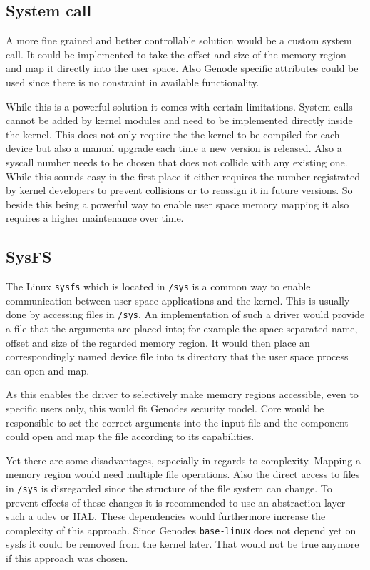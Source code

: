 \documentclass[
a4paper,
12pt,
notitlepage,
parskip=half,
DIV=11,
]{scrbook}
\begin{document}
		\subsection{System call}
		
		A more fine grained and better controllable solution would be a custom system call.
		It could be implemented to take the offset and size of the memory region and map it directly into the user space.
		Also Genode specific attributes could be used since there is no constraint in available functionality.
		
		While this is a powerful solution it comes with certain limitations.
		System calls cannot be added by kernel modules and need to be implemented directly inside the kernel.
		This does not only require the the kernel to be compiled for each device but also a manual upgrade each time a new version is released.
		Also a syscall number needs to be chosen that does not collide with any existing one.
		While this sounds easy in the first place it either requires the number registrated by kernel developers to prevent collisions or to reassign it in future versions.
		So beside this being a powerful way to enable user space memory mapping it also requires a higher maintenance over time. \citep{syscall}
		
		\subsection{SysFS}
		
		The Linux \texttt{sysfs} which is located in \texttt{/sys} is a common way to enable communication between user space applications and the kernel.
		This is usually done by accessing files in \texttt{/sys}.
		An implementation of such a driver would provide a file that the arguments are placed into; for example the space separated name, offset and size of the regarded memory region.
		It would then place an correspondingly named device file into ts directory that the user space process can open and map. \citep{sysfs}
		
		As this enables the driver to selectively make memory regions accessible, even to specific users only, this would fit Genodes security model.
		Core would be responsible to set the correct arguments into the input file and the component could open and map the file according to its capabilities.
		
		Yet there are some disadvantages, especially in regards to complexity.
		Mapping a memory region would need multiple file operations.
		Also the direct access to files in \texttt{/sys} is disregarded since the structure of the file system can change.
		To prevent effects of these changes it is recommended to use an abstraction layer such a udev or HAL.
		These dependencies would furthermore increase the complexity of this approach.
		Since Genodes \texttt{base-linux} does not depend yet on sysfs it could be removed from the kernel later.
		That would not be true anymore if this approach was chosen. \citep{sysfs}
		
\end{document}
